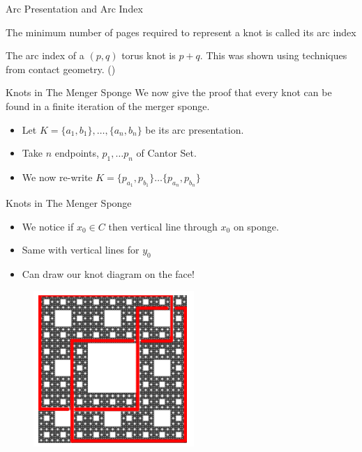 \begin{frame}{Arc Presentation and Arc Index}
\vspace{20px}
\begin{definition}
    The minimum number of pages required to represent a knot is called its arc index
\end{definition}

\begin{example}
    The arc index of a $(p,q)$ torus knot is $p+q$. This was shown using techniques from contact geometry. (\cite{etnyre2000knotscontactgeometry})
\end{example}
\end{frame}

\begin{frame}[c]{Knots in The Menger Sponge}
We now give the proof that every knot can be found in a finite iteration of the merger sponge.
\begin{itemize}
    \item Let $K = \{a_1, b_1\}, \dots, \{a_n, b_n\}$ be its arc presentation.
    \item Take $n$ endpoints, $p_1, \dots p_n $ of Cantor Set.
    \item We now re-write $K = \{p_{a_1}, p_{b_1}\} \dots \{p_{a_n}, p_{b_n}\}$
\end{itemize}
\end{frame}

\begin{frame}[c]{Knots in The Menger Sponge}
\begin{itemize}
    \item We notice if $x_0 \in C$ then vertical line through $x_0 $ on sponge.
    \item Same with vertical lines for $y_0$
    \item Can draw our knot diagram on the face!
\end{itemize}

\begin{figure}
    \centering
    \includegraphics[width=0.2\linewidth]{KnotOnFace.png}
    \caption{\cite{broden2024knotsinsidefractals}}
    \label{fig:enter-label}
\end{figure}
\end{frame}

